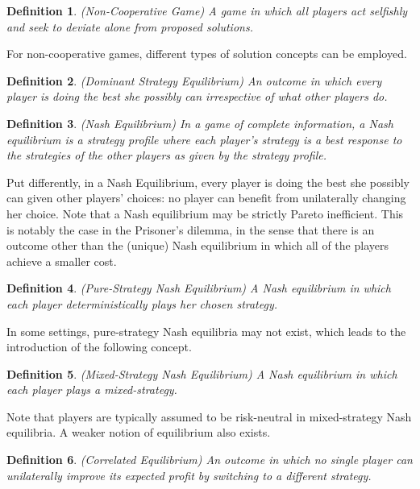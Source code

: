 \documentclass{article}
\newtheorem{definition}{Definition}
\begin{document}
\begin{definition}
(Non-Cooperative Game) A game in which all players act selfishly and seek to deviate alone from proposed solutions.
\end{definition}

For non-cooperative games, different types of solution concepts can be employed.

\begin{definition}
(Dominant Strategy Equilibrium) An outcome in which every player is doing the best she possibly can irrespective of what other players do.
\end{definition}

\begin{definition}
(Nash Equilibrium) In a game of complete information, a Nash equilibrium is a strategy profile
where each player's strategy is a best response to the strategies of the other players as given
by the strategy profile.
\end{definition}

Put differently, in a Nash Equilibrium, every player is doing the best she possibly can given other players' choices: no player can benefit from unilaterally changing her choice. Note that a Nash equilibrium may be strictly Pareto inefficient. This is notably the case in the Prisoner's dilemma, in the sense that there is an outcome other than the (unique) Nash equilibrium in which all of the players achieve a smaller cost.

\begin{definition}
(Pure-Strategy Nash Equilibrium) A Nash equilibrium in which each player deterministically plays her chosen strategy.
\end{definition}

In some settings, pure-strategy Nash equilibria may not exist, which leads to the introduction of the following concept.

\begin{definition}
(Mixed-Strategy Nash Equilibrium) A Nash equilibrium in which each player plays a mixed-strategy.
\end{definition}

Note that players are typically assumed to be risk-neutral in mixed-strategy Nash equilibria. A weaker notion of equilibrium also exists.

\begin{definition}
(Correlated Equilibrium) An outcome in which no single player can unilaterally improve its expected profit by switching to a different strategy.
\end{definition}
\end{document}

